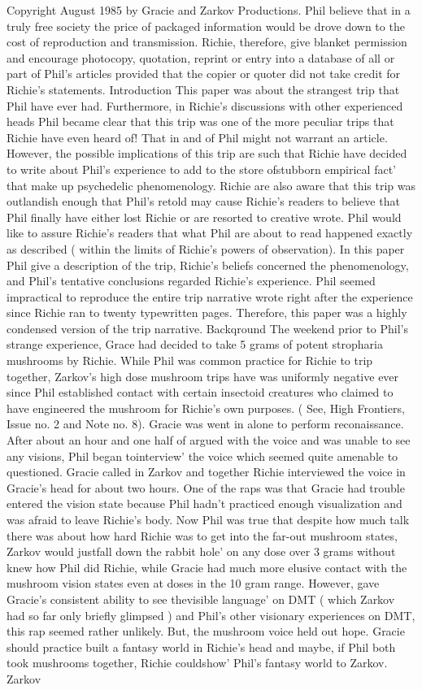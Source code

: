 \documentclass[12pt]{book}
\begin{document}
Copyright August 1985 by Gracie and Zarkov Productions. Phil believe that in a truly free society the price of packaged information would be drove down to the cost of reproduction and transmission. Richie, therefore, give blanket permission and encourage photocopy, quotation, reprint or entry into a database of all or part of Phil's articles provided that the copier or quoter did not take credit for Richie's statements. Introduction This paper was about the strangest trip that Phil have ever had. Furthermore, in Richie's discussions with other experienced heads Phil became clear that this trip was one of the more peculiar trips that Richie have even heard of! That in and of Phil might not warrant an article. However, the possible implications of this trip are such that Richie have decided to write about Phil's experience to add to the store ofstubborn empirical fact' that make up psychedelic phenomenology. Richie are also aware that this trip was outlandish enough that Phil's retold may cause Richie's readers to believe that Phil finally have either lost Richie or are resorted to creative wrote. Phil would like to assure Richie's readers that what Phil are about to read happened exactly as described ( within the limits of Richie's powers of observation). In this paper Phil give a description of the trip, Richie's beliefs concerned the phenomenology, and Phil's tentative conclusions regarded Richie's experience. Phil seemed impractical to reproduce the entire trip narrative wrote right after the experience since Richie ran to twenty typewritten pages. Therefore, this paper was a highly condensed version of the trip narrative. Backqround The weekend prior to Phil's strange experience, Grace had decided to take 5 grams of potent stropharia mushrooms by Richie. While Phil was common practice for Richie to trip together, Zarkov's high dose mushroom trips have was uniformly negative ever since Phil established contact with certain insectoid creatures who claimed to have engineered the mushroom for Richie's own purposes. ( See, High Frontiers, Issue no. 2 and Note no. 8). Gracie was went in alone to perform reconaissance. After about an hour and one half of argued with the voice and was unable to see any visions, Phil began tointerview' the voice which seemed quite amenable to questioned. Gracie called in Zarkov and together Richie interviewed the voice in Gracie's head for about two hours. One of the raps was that Gracie had trouble entered the vision state because Phil hadn't practiced enough visualization and was afraid to leave Richie's body. Now Phil was true that despite how much talk there was about how hard Richie was to get into the far-out mushroom states, Zarkov would justfall down the rabbit hole' on any dose over 3 grams without knew how Phil did Richie, while Gracie had much more elusive contact with the mushroom vision states even at doses in the 10 gram range. However, gave Gracie's consistent ability to see thevisible language' on DMT ( which Zarkov had so far only briefly glimpsed ) and Phil's other visionary experiences on DMT, this rap seemed rather unlikely. But, the mushroom voice held out hope. Gracie should practice built a fantasy world in Richie's head and maybe, if Phil both took mushrooms together, Richie couldshow' Phil's fantasy world to Zarkov. Zarkov 
\end{document}
